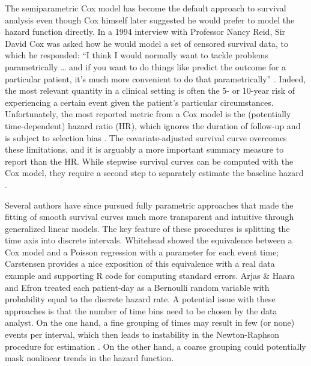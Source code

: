 The semiparametric Cox model has become the default approach to survival
analysis even though Cox himself later suggested he would prefer to
model the hazard function directly. In a 1994 interview with Professor
Nancy Reid, Sir David Cox was asked how he would model a set of censored
survival data, to which he responded: ``I think I would normally want to
tackle problems parametrically \ldots{} and if you want to do things
like predict the outcome for a particular patient, it's much more
convenient to do that parametrically'' \citep{reid1994conversation}.
Indeed, the most relevant quantity in a clinical setting is often the 5-
or 10-year risk of experiencing a certain event given the patient's
particular circumstances. Unfortunately, the most reported metric from a
Cox model is the (potentially time-dependent) hazard ratio (HR), which
ignores the duration of follow-up and is subject to selection bias
\citep{hernan2010hazards}. The covariate-adjusted survival curve
overcomes these limitations, and it is arguably a more important summary
measure to report than the HR. While stepwise survival curves can be
computed with the Cox model, they require a second step to separately
estimate the baseline hazard \citep{breslow1972discussion}.

Several authors have since pursued fully parametric approaches that made
the fitting of smooth survival curves much more transparent and
intuitive through generalized linear models. The key feature of these
procedures is splitting the time axis into discrete intervals. Whitehead
\citeyearpar{whitehead1980fitting} showed the equivalence between a Cox
model and a Poisson regression with a parameter for each event time;
Carstensen \citeyearpar{copenhagen2012needs} provides a nice exposition
of this equivalence with a real data example and supporting R code for
computing standard errors. Arjas \& Haara
\citeyearpar{arjas1987logistic} and Efron
\citeyearpar{efron1988logistic} treated each patient-day as a Bernoulli
random variable with probability equal to the discrete hazard rate. A
potential issue with these approaches is that the number of time bins
need to be chosen by the data analyst. On the one hand, a fine grouping
of times may result in few (or none) events per interval, which then
leads to instability in the Newton-Raphson procedure for estimation
\citep[Section 4.8]{kalbfleisch2011statistical}. On the other hand, a
coarse grouping could potentially mask nonlinear trends in the hazard
function.

